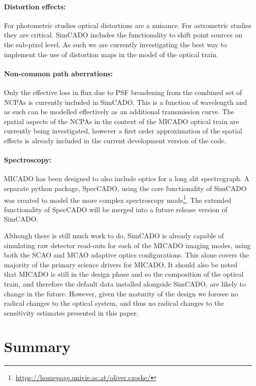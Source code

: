 \paragraph{Distortion effects:}
For photometric studies optical distortions are a nuisance.
For astrometric studies they are critical.
SimCADO includes the functionality to shift point sources on the sub-pixel level.
As such we are currently investigating the best way to implement the use of distortion maps in the model of the optical train.

\paragraph{Non-common path aberrations:} Only the effective loss in flux due to PSF broadening from the combined set of NCPAs is currently included in SimCADO.
This is a function of wavelength and as such can be modelled effectively as an additional transmission curve.
The spatial aspects of the NCPAs in the context of the MICADO optical train are currently being investigated, however a first order approximation of the spatial effects is already included in the current development version of the code.

\paragraph{Spectroscopy:} MICADO has been designed to also include optics for a long slit spectrograph.
A separate python package, SpecCADO, using the core functionality of SimCADO was created to model the more complex spectroscopy mode\footnote{\url{https://homepage.univie.ac.at/oliver.czoske/}}.
The extended functionality of SpecCADO will be merged into a future release version of SimCADO.

Although there is still much work to do, SimCADO is already capable of simulating raw detector read-outs for each of the MICADO imaging modes, using both the SCAO and MCAO adaptive optics configurations.
This alone covers the majority of the primary science drivers for MICADO.
It should also be noted that MICADO is still in the design phase and so the composition of the optical train, and therefore the default data installed alongside SimCADO, are likely to change in the future.
However, given the maturity of the design we foresee no radical changes to the optical system, and thus no radical changes to the sensitivity estimates presented in this paper.


\section{Summary}
\label{sec:conclusions}

